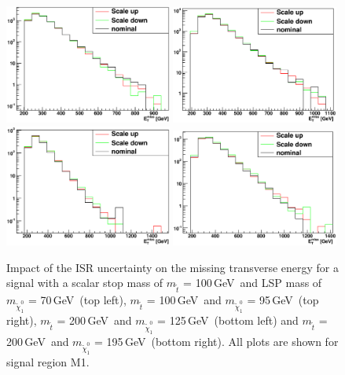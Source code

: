 \begin{figure}[tb]
\begin{center}
  \includegraphics[width=0.49\textwidth]{Interpretations/Figures/stop_100_70_Alpha_s.eps} 
  \includegraphics[width=0.49\textwidth]{Interpretations/Figures/stop_100_95_Alpha_s.eps} 
  \includegraphics[width=0.49\textwidth]{Interpretations/Figures/stop_200_125_Alpha_s.eps}
  \includegraphics[width=0.49\textwidth]{Interpretations/Figures/stop_200_195_Alpha_s.eps}
\end{center}
\caption[Impact of the ISR uncertainty on several signal models.]{Impact of the ISR uncertainty on the missing transverse
  energy for a signal with a scalar
  stop mass of $m_{\tilde{t}}$ = 100\,GeV\ and LSP mass of
  $m_{\tilde{\chi}^0_1}$ = 70\,GeV\ (top left), $m_{\tilde{t}}$ = 100\,GeV\ and
  $m_{\tilde{\chi}^0_1}$ = 95\,GeV\ (top right), $m_{\tilde{t}}$ = 200\,GeV\ and
  $m_{\tilde{\chi}^0_1}$ = 125\,GeV\ (bottom left) and $m_{\tilde{t}}$ = 200\,GeV\ and
  $m_{\tilde{\chi}^0_1}$ = 195\,GeV\ (bottom right). All plots are
  shown for signal region M1.}
\label{fig:signalisrsysta6}
\end{figure}

